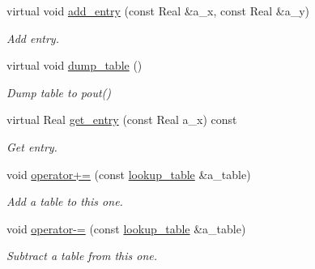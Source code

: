 \begin{DoxyCompactItemize}
virtual void \hyperlink{classlookup__table_a9d0d794013e3c2a5b5879692d69295b5}{add\+\_\+entry} (const Real \&a\+\_\+x, const Real \&a\+\_\+y)
\begin{DoxyCompactList}\small\item\em Add entry. \end{DoxyCompactList}\item 
virtual void \hyperlink{classlookup__table_a8fd366464e73bd535893926ab5f3479e}{dump\+\_\+table} ()
\begin{DoxyCompactList}\small\item\em Dump table to pout() \end{DoxyCompactList}\item 
virtual Real \hyperlink{classlookup__table_a00955ad00b4405af6093d2feb291d3d5}{get\+\_\+entry} (const Real a\+\_\+x) const 
\begin{DoxyCompactList}\small\item\em Get entry. \end{DoxyCompactList}\item 
void \hyperlink{classlookup__table_a871356f16ddd456aaef5efe3dfed14ca}{operator+=} (const \hyperlink{classlookup__table}{lookup\+\_\+table} \&a\+\_\+table)
\begin{DoxyCompactList}\small\item\em Add a table to this one. \end{DoxyCompactList}\item 
void \hyperlink{classlookup__table_a20ecf511e86c1cfa00c16a8f30db00c6}{operator-\/=} (const \hyperlink{classlookup__table}{lookup\+\_\+table} \&a\+\_\+table)
\begin{DoxyCompactList}\small\item\em Subtract a table from this one. \end{DoxyCompactList}\end{DoxyCompactItemize}
